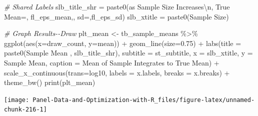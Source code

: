 \documentclass[
]{book}
\newenvironment{Shaded}{\begin{snugshade}}{\end{snugshade}}
\newcommand{\AttributeTok}[1]{\textcolor[rgb]{0.77,0.63,0.00}{#1}}
\newcommand{\CommentTok}[1]{\textcolor[rgb]{0.56,0.35,0.01}{\textit{#1}}}
\newcommand{\FloatTok}[1]{\textcolor[rgb]{0.00,0.00,0.81}{#1}}
\newcommand{\FunctionTok}[1]{\textcolor[rgb]{0.00,0.00,0.00}{#1}}
\newcommand{\NormalTok}[1]{#1}
\newcommand{\OtherTok}[1]{\textcolor[rgb]{0.56,0.35,0.01}{#1}}
\newcommand{\SpecialCharTok}[1]{\textcolor[rgb]{0.00,0.00,0.00}{#1}}
\newcommand{\StringTok}[1]{\textcolor[rgb]{0.31,0.60,0.02}{#1}}
\begin{document}
\begin{Shaded}
\begin{Highlighting}[]
\CommentTok{\# Shared Labels}
\NormalTok{slb\_title\_shr }\OtherTok{=} \FunctionTok{paste0}\NormalTok{(}\StringTok{\textquotesingle{}as Sample Size Increases}\SpecialCharTok{\textbackslash{}n}\StringTok{\textquotesingle{}}\NormalTok{,}
                       \StringTok{\textquotesingle{}True Mean=\textquotesingle{}}\NormalTok{, fl\_eps\_mean,}\StringTok{\textquotesingle{}, sd=\textquotesingle{}}\NormalTok{,fl\_eps\_sd)}
\NormalTok{slb\_xtitle }\OtherTok{=} \FunctionTok{paste0}\NormalTok{(}\StringTok{\textquotesingle{}Sample Size\textquotesingle{}}\NormalTok{)}

\CommentTok{\# Graph Results{-}{-}Draw}
\NormalTok{plt\_mean }\OtherTok{\textless{}{-}}\NormalTok{ tb\_sample\_means }\SpecialCharTok{\%\textgreater{}\%}
  \FunctionTok{ggplot}\NormalTok{(}\FunctionTok{aes}\NormalTok{(}\AttributeTok{x=}\NormalTok{draw\_count, }\AttributeTok{y=}\NormalTok{mean)) }\SpecialCharTok{+}
  \FunctionTok{geom\_line}\NormalTok{(}\AttributeTok{size=}\FloatTok{0.75}\NormalTok{) }\SpecialCharTok{+}
  \FunctionTok{labs}\NormalTok{(}\AttributeTok{title =} \FunctionTok{paste0}\NormalTok{(}\StringTok{\textquotesingle{}Sample Mean \textquotesingle{}}\NormalTok{, slb\_title\_shr),}
       \AttributeTok{subtitle =}\NormalTok{ st\_subtitle,}
       \AttributeTok{x =}\NormalTok{ slb\_xtitle,}
       \AttributeTok{y =} \StringTok{\textquotesingle{}Sample Mean\textquotesingle{}}\NormalTok{,}
       \AttributeTok{caption =} \StringTok{\textquotesingle{}Mean of Sample Integrates to True Mean\textquotesingle{}}\NormalTok{) }\SpecialCharTok{+}
  \FunctionTok{scale\_x\_continuous}\NormalTok{(}\AttributeTok{trans=}\StringTok{\textquotesingle{}log10\textquotesingle{}}\NormalTok{, }\AttributeTok{labels =}\NormalTok{ x.labels, }\AttributeTok{breaks =}\NormalTok{ x.breaks) }\SpecialCharTok{+}
  \FunctionTok{theme\_bw}\NormalTok{()}
\FunctionTok{print}\NormalTok{(plt\_mean)}
\end{Highlighting}
\end{Shaded}

\begin{center}\texttt{[image: Panel-Data-and-Optimization-with-R\_files/figure-latex/unnamed-chunk-216-1]} \end{center}
\end{document}
